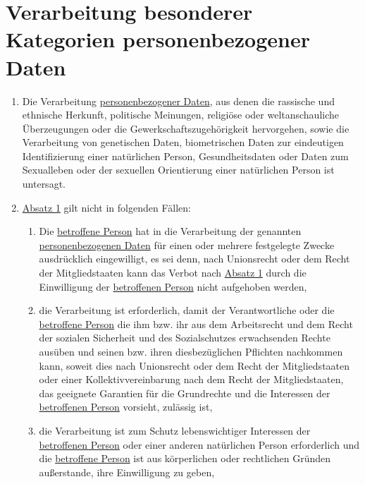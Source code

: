 \chapter{Verarbeitung besonderer Kategorien personenbezogener Daten}
\label{ch:9}


\begin{enumerate}

  \item Die Verarbeitung \hyperref[itm:04-1]{personenbezogener Daten}, aus denen die rassische und ethnische Herkunft, politische Meinungen,
   religiöse oder weltanschauliche Überzeugungen oder die Gewerkschaftszugehörigkeit hervorgehen, sowie die
   Verarbeitung von genetischen Daten, biometrischen Daten zur eindeutigen Identifizierung einer natürlichen Person,
   Gesundheitsdaten oder Daten zum Sexualleben oder der sexuellen Orientierung einer natürlichen Person ist untersagt.
  \label{itm:09-1}

  \item \hyperref[itm:09-1]{Absatz 1} gilt nicht in folgenden Fällen:
  \label{itm:09-2}

  \begin{enumerate}
  
    \item Die \hyperref[itm:04-1]{betroffene Person} hat in die Verarbeitung der genannten \hyperref[itm:04-1]{personenbezogenen Daten} für einen oder mehrere
     festgelegte Zwecke ausdrücklich eingewilligt, es sei denn, nach Unionsrecht oder dem Recht der Mitgliedstaaten
     kann das Verbot nach \hyperref[itm:09-1]{Absatz 1} durch die Einwilligung der \hyperref[itm:04-1]{betroffenen Person} nicht aufgehoben
     werden,
    \label{itm:09-2a}

    \item die Verarbeitung ist erforderlich, damit der Verantwortliche oder die \hyperref[itm:04-1]{betroffene Person} die ihm bzw. ihr aus
     dem Arbeitsrecht und dem Recht der sozialen Sicherheit und des Sozialschutzes erwachsenden Rechte ausüben und
     seinen bzw. ihren diesbezüglichen Pflichten nachkommen kann, soweit dies nach Unionsrecht oder dem Recht der
     Mitgliedstaaten oder einer Kollektivvereinbarung nach dem Recht der Mitgliedstaaten, das geeignete Garantien für
     die Grundrechte und die Interessen der \hyperref[itm:04-1]{betroffenen Person} vorsieht, zulässig ist,
    \label{itm:09-2b}

    \item die Verarbeitung ist zum Schutz lebenswichtiger Interessen der \hyperref[itm:04-1]{betroffenen Person} oder einer anderen
     natürlichen Person erforderlich und die \hyperref[itm:04-1]{betroffene Person} ist aus körperlichen oder rechtlichen Gründen
     außerstande, ihre Einwilligung zu geben,
    \label{itm:09-2c}


\end{enumerate}
\end{enumerate}

